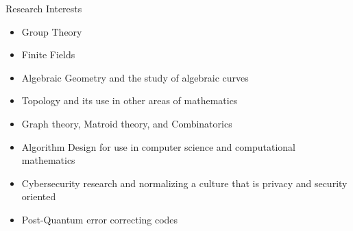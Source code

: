 \documentclass{resume} %
\begin{document}
\begin{rSection}{Research Interests}
    \begin{multicols}{2}
    \begin{itemize}
        \item Group Theory

        \item Finite Fields

        \item Algebraic Geometry and the study of algebraic curves

        \item Topology and its use in other areas of mathematics

        \item Graph theory, Matroid theory, and Combinatorics

        \item Algorithm Design for use in computer science and computational
            mathematics

        \item Cybersecurity research and normalizing a culture that is privacy
            and security oriented

        \item Post-Quantum error correcting codes
    \end{itemize}
    \end{multicols}
\end{rSection}
\end{document}
